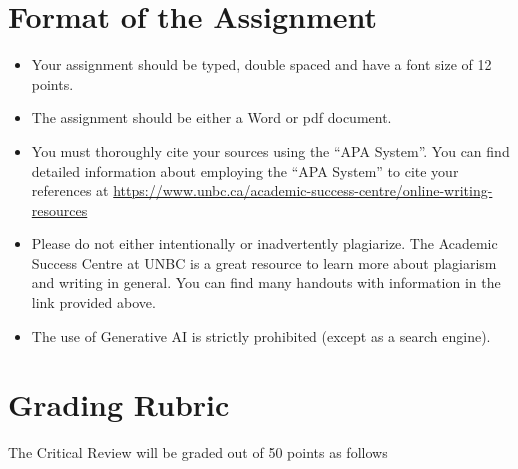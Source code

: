 \documentclass[letterpaper,12pt]{article}
\theoremstyle{dotlessS}
\begin{document}
\section*{Format of the Assignment}
\begin{itemize}
\item Your assignment should be typed, double spaced and have a font size of 12 points. 
\item The assignment should be either a Word or pdf document.
\item You must thoroughly cite your sources using the ``APA System''. You can find detailed information about employing the ``APA System'' to cite your references at \url{https://www.unbc.ca/academic-success-centre/online-writing-resources}
\item Please do not either intentionally or inadvertently plagiarize. The Academic Success Centre at UNBC is a great resource to learn more about plagiarism and writing in general. You can find many handouts with information in the link provided above. 
\item The use of Generative AI is strictly prohibited (except as a search engine).    
\end{itemize}

\section*{Grading Rubric}
The Critical Review will be graded out of 50 points as follows
\end{document}
